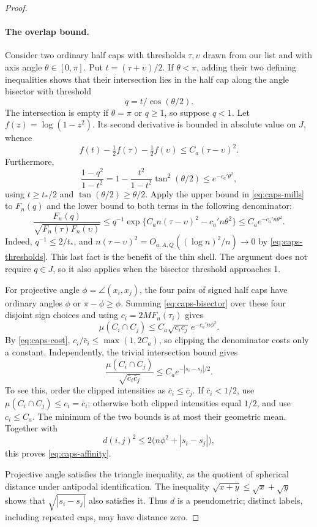 \begin{proof}
\paragraph{The overlap bound.}
Consider two ordinary half caps with thresholds \(\tau,\upsilon\)
drawn from our list and with axis angle \(\theta\in[0,\pi]\).
Put \(t=(\tau+\upsilon)/2\). If \(\theta<\pi\), adding their two
defining inequalities shows that their intersection lies in the half
cap along the angle bisector with threshold
\[
 q=t/\cos(\theta/2).
\]
The intersection is empty if \(\theta=\pi\) or \(q\ge1\), so suppose
\(q<1\). Let \(f(z)=\log(1-z^2)\). Its second derivative is bounded
in absolute value on \(J\), whence
\[
 f(t)-\tfrac12 f(\tau)-\tfrac12 f(\upsilon)
 \le C_a(\tau-\upsilon)^2.
\]
Furthermore,
\[
 \frac{1-q^2}{1-t^2}
 =1-\frac{t^2}{1-t^2}\tan^2(\theta/2)
 \le e^{-c_a'\theta^2},
\]
using \(t\ge t_*/2\) and \(\tan(\theta/2)\ge\theta/2\).
Apply the upper bound in \eqref{eq:caps-mills} to \(F_n(q)\) and
the lower bound to both terms in the following denominator:
\begin{equation}
 \frac{F_n(q)}{\sqrt{F_n(\tau)F_n(\upsilon)}}
 \le q^{-1}\exp\{C_an(\tau-\upsilon)^2-c_a'n\theta^2\}
 \le C_a e^{-c_a'n\theta^2}.
 \label{eq:caps-bisector}
\end{equation}
Indeed, \(q^{-1}\le2/t_*\), and
\(n(\tau-\upsilon)^2=O_{a,A,Q}((\log n)^2/n)\to0\) by
\eqref{eq:caps-thresholds}. This last fact is the benefit of the
thin shell. The argument does not require \(q\in J\), so it also
applies when the bisector threshold approaches 1.

For projective angle \(\phi=\angle(x_i,x_j)\), the four pairs of
signed half caps have ordinary angles \(\phi\) or
\(\pi-\phi\ge\phi\). Summing \eqref{eq:caps-bisector} over these
four disjoint sign choices and using \(c_i=2MF_n(\tau_i)\) gives
\[
 \mu(C_i\cap C_j)\le C_a\sqrt{c_ic_j}\,e^{-c_a'n\phi^2}.
\]
By \eqref{eq:caps-cost}, \(c_i/\bar c_i\le\max(1,2C_a)\), so
clipping the denominator costs only a constant. Independently, the
trivial intersection bound gives
\[
 \frac{\mu(C_i\cap C_j)}{\sqrt{\bar c_i\bar c_j}}
 \le C_a e^{-|s_i-s_j|/2}.
\]
To see this, order the clipped intensities as
\(\bar c_i\le\bar c_j\). If \(\bar c_i<1/2\), use
\(\mu(C_i\cap C_j)\le c_i=\bar c_i\); otherwise both clipped
intensities equal \(1/2\), and use \(c_i\le C_a\).
The minimum of the two bounds is at most their geometric mean.
Together with
\[
 d(i,j)^2\le2\bigl(n\phi^2+|s_i-s_j|\bigr),
\]
this proves \eqref{eq:caps-affinity}.

Projective angle satisfies the triangle inequality, as the quotient
of spherical distance under antipodal identification. The inequality
\(\sqrt{x+y}\le\sqrt x+\sqrt y\) shows that
\(\sqrt{|s_i-s_j|}\) also satisfies it. Thus \(d\) is a
pseudometric; distinct labels, including repeated caps, may have
distance zero.


\end{proof}
